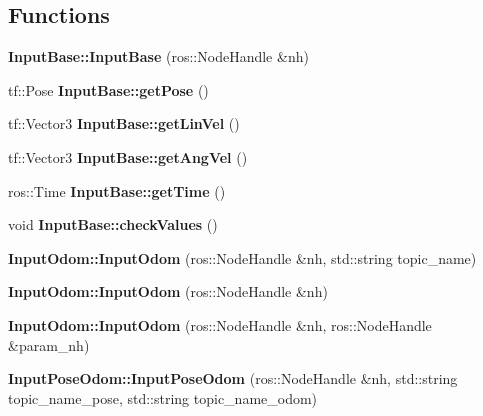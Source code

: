 \subsection*{Functions}
\begin{DoxyCompactItemize}
\item 
\mbox{\label{group__Input_gae49ba3ba26afd0315dc99f055b8d2f43}} 
{\bfseries Input\+Base\+::\+Input\+Base} (ros\+::\+Node\+Handle \&nh)
\item 
\mbox{\label{group__Input_gac7dcd07984459ebc0c23436a4170bfbc}} 
tf\+::\+Pose {\bfseries Input\+Base\+::get\+Pose} ()
\item 
\mbox{\label{group__Input_gaf7b759985fd0b5d278050864382b2c57}} 
tf\+::\+Vector3 {\bfseries Input\+Base\+::get\+Lin\+Vel} ()
\item 
\mbox{\label{group__Input_ga89ed5c155c3326ca3b266b9ae76b9f94}} 
tf\+::\+Vector3 {\bfseries Input\+Base\+::get\+Ang\+Vel} ()
\item 
\mbox{\label{group__Input_ga3218880f2d8bf2d992875815d9264074}} 
ros\+::\+Time {\bfseries Input\+Base\+::get\+Time} ()
\item 
\mbox{\label{group__Input_gafa9f4394ddd1e7d309fd6cafcd966357}} 
void {\bfseries Input\+Base\+::check\+Values} ()
\item 
\mbox{\label{group__Input_gaf881b8cce924ac7c6ada67a779696606}} 
{\bfseries Input\+Odom\+::\+Input\+Odom} (ros\+::\+Node\+Handle \&nh, std\+::string topic\+\_\+name)
\item 
\mbox{\label{group__Input_gad3ef3816f437f8cd96c6fee8c7b1ba2a}} 
{\bfseries Input\+Odom\+::\+Input\+Odom} (ros\+::\+Node\+Handle \&nh)
\item 
\mbox{\label{group__Input_ga8c3c565c212707fbe1d33a412170465d}} 
{\bfseries Input\+Odom\+::\+Input\+Odom} (ros\+::\+Node\+Handle \&nh, ros\+::\+Node\+Handle \&param\+\_\+nh)
\item 
\mbox{\label{group__Input_gad2de7e036d10a05678ac2489a97f84db}} 
{\bfseries Input\+Pose\+Odom\+::\+Input\+Pose\+Odom} (ros\+::\+Node\+Handle \&nh, std\+::string topic\+\_\+name\+\_\+pose, std\+::string topic\+\_\+name\+\_\+odom)

\end{DoxyCompactItemize}
